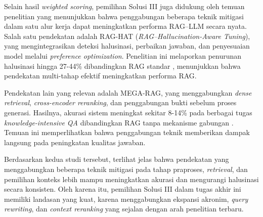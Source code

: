 Selain hasil \textit{weighted scoring}, pemilihan Solusi III juga didukung oleh temuan penelitian yang menunjukkan bahwa penggabungan beberapa teknik mitigasi dalam satu alur kerja dapat meningkatkan performa RAG–LLM secara nyata. Salah satu pendekatan adalah RAG-HAT (\textit{RAG–Hallucination-Aware Tuning}), yang mengintegrasikan deteksi halusinasi, perbaikan jawaban, dan penyesuaian model melalui \textit{preference optimization}. Penelitian ini melaporkan penurunan halusinasi hingga 27-44\% dibandingkan RAG standar \parencite{song2024raghat}, menunjukkan bahwa pendekatan multi-tahap efektif meningkatkan performa RAG.

Pendekatan lain yang relevan adalah MEGA-RAG, yang menggabungkan \textit{dense retrieval}, \textit{cross-encoder reranking}, dan penggabungan bukti sebelum proses generasi. Hasilnya, akurasi sistem meningkat sekitar 8-14\% pada berbagai tugas \textit{knowledge-intensive QA} dibandingkan RAG tanpa mekanisme gabungan \parencite{li2023megarag}. Temuan ini memperlihatkan bahwa penggabungan teknik memberikan dampak langsung pada peningkatan kualitas jawaban.

Berdasarkan kedua studi tersebut, terlihat jelas bahwa pendekatan yang menggabungkan beberapa teknik mitigasi pada tahap praproses, \textit{retrieval}, dan pemilihan konteks lebih mampu meningkatkan akurasi dan mengurangi halusinasi secara konsisten. Oleh karena itu, pemilihan Solusi III dalam tugas akhir ini memiliki landasan yang kuat, karena menggabungkan ekspansi akronim, \textit{query rewriting}, dan \textit{context reranking} yang sejalan dengan arah penelitian terbaru.